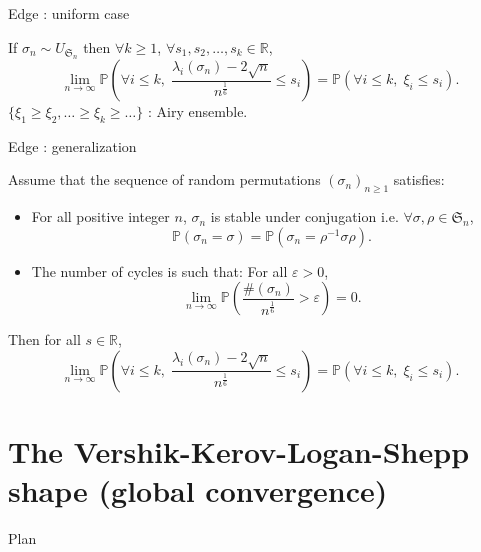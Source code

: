 \documentclass[english]{beamer}
\begin{document}
\begin{frame}{Edge : uniform case}
\begin{theorem} 
 If $\sigma_n \sim {U}_{\mathfrak{S}_n}$ then  $\forall k \geq 1 $,  $\forall s_1,s_2,\dots,s_k \in \mathbb{R}$,
\begin{equation*} 
\lim_{n\to \infty}\mathbb{P}\left(\forall i\leq k, \;\frac{\lambda_i(\sigma_n)-2\sqrt{n}}{n^\frac{1}{6}}\leq s_i\right)=\mathbb{P}(\forall i\leq k,\;\xi_i\leq s_i).
\end{equation*}
$\{\xi_1\geq \xi_2,\dots\geq  \xi_k \geq  \dots \}$ : Airy ensemble.
\end{theorem}

\end{frame}
\begin{frame}{Edge : generalization}
    \begin{theorem}[\cite{sk}]
Assume that the sequence of random permutations  $(\sigma_n)_{n\geq 1}$ satisfies:
\begin{itemize}
\item  For all positive integer $n$, $\sigma_n$ is stable under conjugation i.e.  $\forall \sigma , \rho \in \mathfrak{S}_n$,
\begin{equation}\tag{H1}
\mathbb{P}(\sigma_n=\sigma)=\mathbb{P}(\sigma_n=\rho^{-1}\sigma\rho).
\end{equation}
\item The number of cycles is such that: For all $\varepsilon>0$,
\begin{equation}\tag{H2}
\lim_{n\to \infty}\mathbb{P}\left(\frac{\#(\sigma_n)}{n^\frac 16 }>\varepsilon\right) =0.
\end{equation}
\end{itemize}
Then  for all  $s \in \mathbb{R}$,
\begin{equation*} 
\lim_{n\to \infty}\mathbb{P}\left(\forall i\leq k, \;\frac{\lambda_i(\sigma_n)-2\sqrt{n}}{n^\frac{1}{6}}\leq s_i\right)=\mathbb{P}(\forall i\leq k,\;\xi_i\leq s_i).\end{equation*}
\end{theorem}
\end{frame}

\section{The Vershik-Kerov-Logan-Shepp shape (global convergence)}

\begin{frame}{Plan}
\tableofcontents[currentsection,currentsubsection,
    hideothersubsections, 
    sectionstyle=show/shaded,
]
\end{frame}
\end{document}
